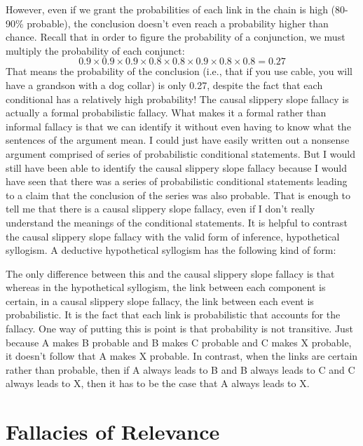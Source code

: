 However, even if we grant the probabilities of each link in the chain is high (80-90\% probable), the conclusion doesn't even reach a probability higher than chance. Recall that in order to figure the probability of a conjunction, we must multiply the probability of each conjunct:
$$0.9 \times 0.9 \times 0.9 \times 0.8 \times 0.8 \times 0.9 \times 0.8 \times 0.8 = 0.27$$
That means the probability of the conclusion (i.e., that if you use cable, you will have a grandson with a dog collar) is only 0.27, despite the fact that each conditional has a relatively high probability! The causal slippery slope fallacy is actually a formal probabilistic fallacy. What makes it a formal rather than informal fallacy is that we can identify it without even having to know what the sentences of the argument mean. I could just have easily written out a nonsense argument comprised of series of probabilistic conditional statements. But I would still have been able to identify the causal slippery slope fallacy because I would have seen that there was a series of probabilistic conditional statements leading to a claim that the conclusion of the series was also probable. That is enough to tell me that there is a causal slippery slope fallacy, even if I don't really understand the meanings of the conditional statements. It is helpful to contrast the causal slippery slope fallacy with the valid form of inference, hypothetical syllogism. A deductive hypothetical syllogism has the following kind of form:
\begin{kormanize}
\end{kormanize}
The only difference between this and the causal slippery slope fallacy is that whereas in the hypothetical syllogism, the link between each component is certain, in a causal slippery slope fallacy, the link between each event is probabilistic. It is the fact that each link is probabilistic that accounts for the fallacy. One way of putting this is point is that probability is not transitive. Just because A makes B probable and B makes C probable and C makes X probable, it doesn't follow that A makes X probable. In contrast, when the links are certain rather than probable, then if A always leads to B and B always leads to C and C always leads to X, then it has to be the case that A always leads to X.

\section{Fallacies of Relevance}\label{sec:fallaciesofrelevance}

